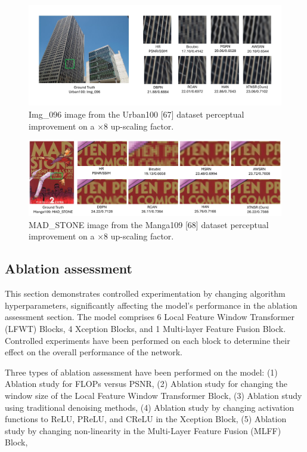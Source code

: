 \documentclass[twocolumn]{svjour3}          %
\begin{document}
\begin{figure}
  \centering
  \includegraphics[width=\linewidth]{18FIGURE.pdf}
   \caption {Img\_096 image from the Urban100 [67] dataset perceptual improvement on a ×8 up-scaling factor.}
    \label{fig:18}
\end{figure}

\begin{figure}
  \centering
  \includegraphics[width=\linewidth]{19FIGURE.pdf}
   \caption {MAD\_STONE image from the Manga109 [68] dataset perceptual improvement on a ×8 up-scaling factor.}
    \label{fig:19}
\end{figure}

\subsection{Ablation assessment}

This section demonstrates controlled experimentation by changing algorithm hyperparameters, significantly affecting the model's performance in the ablation assessment section. The model comprises 6 Local Feature Window Transformer (LFWT) Blocks, 4 Xception Blocks, and 1 Multi-layer Feature Fusion Block. Controlled experiments have been performed on each block to determine their effect on the overall performance of the network.

Three types of ablation assessment have been performed on the model: (1) Ablation study for FLOPs versus PSNR, (2) Ablation study for changing the window size of the Local Feature Window Transformer Block, (3) Ablation study using traditional denoising methods, (4) Ablation study by changing activation functions to ReLU, PReLU, and CReLU in the Xception Block, (5) Ablation study by changing non-linearity in the Multi-Layer Feature Fusion (MLFF) Block,
\end{document}
